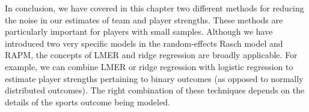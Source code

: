 \documentclass{article}
\begin{document}
  In conclusion, we have covered in this chapter two different methods for reducing the noise in our estimates of team and player strengths. These methods are particularly important for players with small samples. Although we have introduced two very specific models in the random-effects Rasch model and RAPM, the concepts of LMER and ridge regression are broadly applicable. For example, we can combine LMER or ridge regression with logistic regression to estimate player strengths pertaining to binary outcomes (as opposed to normally distributed outcomes). The right combination of these techniques depends on the details of the sports outcome being modeled.
\end{document}
